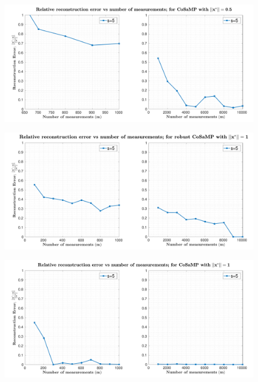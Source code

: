 \begin{figure}[t]
	\begin{center}
		\includegraphics[width=\linewidth]{./fig/plot-1-2.pdf}
	\end{center}
	\caption{}
	\label{fig:plot-1-2}
\end{figure}
%
\begin{figure}[t]
	\begin{center}
		\includegraphics[width=\linewidth]{./fig/plot-1-3.pdf}
	\end{center}
	\caption{}
	\label{fig:plot-1-3}
\end{figure}
%
\begin{figure}[H]
	\begin{center}
		\includegraphics[width=\linewidth]{./fig/plot-1-1.pdf}
	\end{center}
	\caption{}
	\label{fig:plot-1-4}
\end{figure}